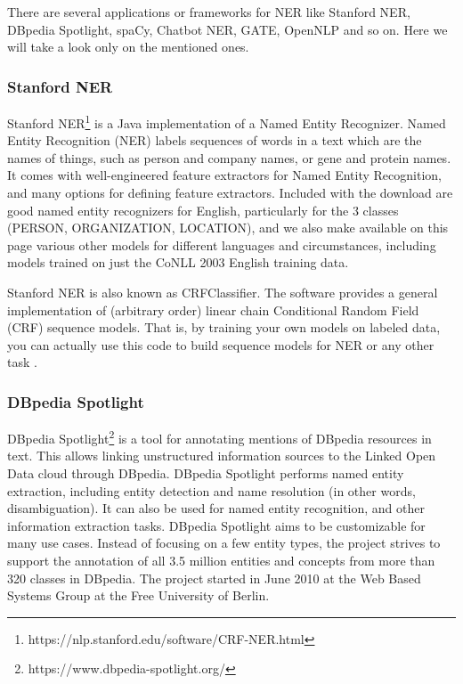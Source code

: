 \documentclass[thesis=M,english]{FITthesis}[2018/05/30]
\begin{document}
	There are several applications or frameworks for NER like Stanford NER, DBpedia Spotlight, spaCy, Chatbot NER, GATE, OpenNLP and so on. Here we will take a look only on the mentioned ones.

\subsubsection{Stanford NER}\label{Stanford NER}
Stanford NER\footnote{https://nlp.stanford.edu/software/CRF-NER.html} is a Java implementation of a Named Entity Recognizer. Named Entity Recognition (NER) labels sequences of words in a text which are the names of things, such as person and company names, or gene and protein names. It comes with well-engineered feature extractors for Named Entity Recognition, and many options for defining feature extractors. Included with the download are good named entity recognizers for English, particularly for the 3 classes (PERSON, ORGANIZATION, LOCATION), and we also make available on this page various other models for different languages and circumstances, including models trained on just the CoNLL 2003 English training data.

Stanford NER is also known as CRFClassifier. The software provides a general implementation of (arbitrary order) linear chain Conditional Random Field (CRF) sequence models. That is, by training your own models on labeled data, you can actually use this code to build sequence models for NER or any other task \cite{article:StanfordNER}.

\subsubsection{DBpedia Spotlight}\label{DBpedia Spotlight}
DBpedia Spotlight\footnote{https://www.dbpedia-spotlight.org/} \cite{wiki:DBpediaSpotlight} is a tool for annotating mentions of DBpedia resources in text. This allows linking unstructured information sources to the Linked Open Data cloud through DBpedia. DBpedia Spotlight performs named entity extraction, including entity detection and name resolution (in other words, disambiguation). It can also be used for named entity recognition, and other information extraction tasks. DBpedia Spotlight aims to be customizable for many use cases. Instead of focusing on a few entity types, the project strives to support the annotation of all 3.5 million entities and concepts from more than 320 classes in DBpedia. The project started in June 2010 at the Web Based Systems Group at the Free University of Berlin.
\end{document}
